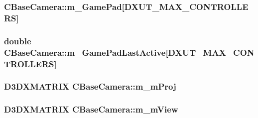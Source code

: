 \label{class_c_base_camera_a39abb4e2ffe603d95bc1f80c3b7e7c86}
\hypertarget{class_c_base_camera_a944fb74264227b610464a055a6d8c9c4}{
\subsubsection[{m\_\-GamePad}]{ {\bf CBaseCamera::m\_\-GamePad}\mbox{[}DXUT\_\-MAX\_\-CONTROLLERS\mbox{]}}}
\label{class_c_base_camera_a944fb74264227b610464a055a6d8c9c4}
\hypertarget{class_c_base_camera_ae2731931f0485bb49b9f3178f9aabe6f}{
\subsubsection[{m\_\-GamePadLastActive}]{\setlength{\rightskip}{0pt plus 5cm}double {\bf CBaseCamera::m\_\-GamePadLastActive}\mbox{[}DXUT\_\-MAX\_\-CONTROLLERS\mbox{]}}}
\label{class_c_base_camera_ae2731931f0485bb49b9f3178f9aabe6f}
\hypertarget{class_c_base_camera_a97b8a160735a4b812e7d3e2637d2025c}{
\subsubsection[{m\_\-mProj}]{\setlength{\rightskip}{0pt plus 5cm}D3DXMATRIX {\bf CBaseCamera::m\_\-mProj}}}
\label{class_c_base_camera_a97b8a160735a4b812e7d3e2637d2025c}
\hypertarget{class_c_base_camera_aa4e76560bdadc557f2e279e8ab00e405}{
\subsubsection[{m\_\-mView}]{\setlength{\rightskip}{0pt plus 5cm}D3DXMATRIX {\bf CBaseCamera::m\_\-mView}}}
